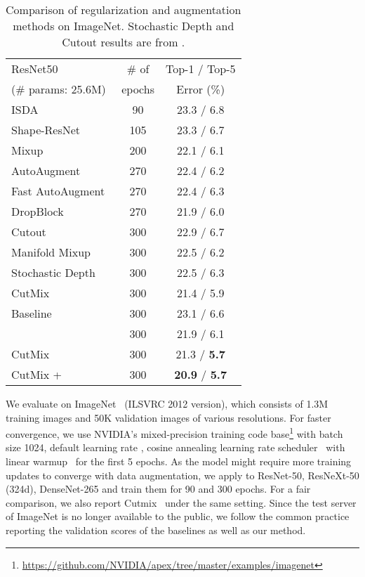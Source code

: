 \documentclass[final]{cvpr}
\begin{document}
\begin{table}[t]
    \centering
    \begin{tabular}{l|c|c}
    \toprule
    ResNet50  & \# of & Top-1 / Top-5\\
   (\# params:  25.6M) & epochs & Error (\%)\\
    \midrule
    \midrule
    ISDA~\cite{wang2019implicit} & 90 & 23.3 / 6.8 \\
    Shape-ResNet~\cite{geirhos2018imagenet} & 105 & 23.3 / 6.7 \\
    Mixup~\cite{zhang2017mixup} & 200 & 22.1 / 6.1  \\
    AutoAugment~\cite{cubuk2019autoaugment} & 270 & 22.4 / 6.2 \\
    Fast AutoAugment~\cite{lim2019fast} & 270 & 22.4 / 6.3 \\
    DropBlock~\cite{ghiasi2018dropblock} & 270 & 21.9 / 6.0 \\
    Cutout~\cite{devries2017cutout}& 300 & 22.9 / 6.7  \\ 
    Manifold Mixup~\cite{zhang2017mixup} & 300 & 22.5 / 6.2 \\
    Stochastic Depth~\cite{huang2016deep} & 300 & 22.5 / 6.3 \\ 
    CutMix~\cite{yun2019cutmix} & 300 & 21.4 / 5.9 \\
    \midrule
    Baseline & 300 & 23.1 / 6.6 \\  
    \methodname{} & 300 & 21.9 / 6.1 \\
    CutMix & 300 & 21.3 / \textbf{5.7} \\
    CutMix + \methodname{} & 300 & \textbf{20.9} / \textbf{5.7} \\
    \bottomrule
\end{tabular}
\caption{Comparison of regularization and augmentation methods on ImageNet. Stochastic Depth and Cutout results are from \cite{yun2019cutmix}.}
\label{tab:imagenet_da_result}     \vspace{-0.2in}
\end{table}

\label{subsec:imagenet}
We evaluate on ImageNet~\cite{deng2009imagenet} (ILSVRC 2012 version), which consists of 1.3M training images and 50K validation images of various resolutions. For faster convergence, we use NVIDIA's mixed-precision training code base\footnote{\href{https://github.com/NVIDIA/apex/tree/master/examples/imagenet}{https://github.com/NVIDIA/apex/tree/master/examples/imagenet}} with batch size 1024, default learning rate , cosine annealing learning rate scheduler~\cite{loshchilov2016sgdr} with linear warmup~\cite{goyal2017accurate} for the first 5 epochs. 
As the model might require more training updates to converge with data augmentation, we apply \methodname{} to ResNet-50, ResNeXt-50 (324d), DenseNet-265 and train them for 90 and 300 epochs. For a fair comparison, we also report Cutmix~\cite{yun2019cutmix} under the same setting.
Since the test server of ImageNet is no longer available to the public, we follow the common practice~\cite{xie2017aggregated,huang2017densely,zhang2017mixup,yun2019cutmix,ghiasi2018dropblock} reporting the validation scores of the baselines as well as our method.
\end{document}
